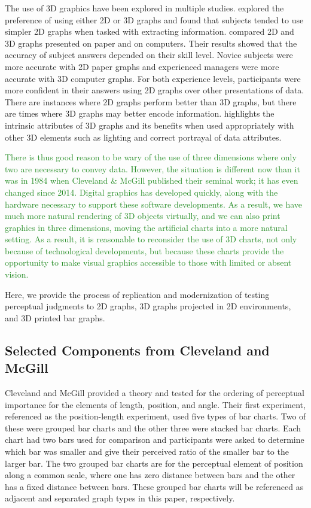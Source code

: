 \documentclass[letterpaper,inpress,dvipsnames]{jdsart}
\begin{document}
The use of 3D graphics have been explored in multiple studies.
\citet{fisher_data_1997} explored the preference of using either 2D or 3D graphs and found that subjects tended to use simpler 2D graphs when tasked with extracting information. \citet{barfield_effects_1989} compared 2D and 3D graphs presented on paper and on computers.
Their results showed that the accuracy of subject answers depended on their skill level.
Novice subjects were more accurate with 2D paper graphs and experienced managers were more accurate with 3D computer graphs.
For both experience levels, participants were more confident in their answers using 2D graphs over other presentations of data.
There are instances where 2D graphs perform better than 3D graphs, but there are times where 3D graphs may better encode information.
\citet{brath_3d_2014} highlights the intrinsic attributes of 3D graphs and its benefits when used appropriately with other 3D elements such as lighting and correct portrayal of data attributes.

{\textcolor{ForestGreen}{There is thus good reason to be wary of the use of three dimensions where only two are necessary to convey data. 
However, the situation is different now than it was in 1984 when Cleveland \& McGill published their seminal work; it has even changed since 2014. 
Digital graphics has developed quickly, along with the hardware necessary to support these software developments. 
As a result, we have much more natural rendering of 3D objects virtually, and we can also print graphics in three dimensions, moving the artificial charts into a more natural setting.
As a result, it is reasonable to reconsider the use of 3D charts, not only because of technological developments, but because these charts provide the opportunity to make visual graphics accessible to those with limited or absent vision.}}

Here, we provide the process of replication and modernization of testing perceptual judgments to 2D graphs, 3D graphs projected in 2D environments, and 3D printed bar graphs.

\hypertarget{selected-components-from-cleveland-and-mcgill}{%
\subsection{Selected Components from Cleveland and McGill}\label{selected-components-from-cleveland-and-mcgill}}

Cleveland and McGill provided a theory and tested for the ordering of perceptual importance for the elements of length, position, and angle.
Their first experiment, referenced as the position-length experiment, used five types of bar charts.
Two of these were grouped bar charts and the other three were stacked bar charts.
Each chart had two bars used for comparison and participants were asked to determine which bar was smaller and give their perceived ratio of the smaller bar to the larger bar.
The two grouped bar charts are for the perceptual element of position along a common scale, where one has zero distance between bars and the other has a fixed distance between bars.
These grouped bar charts will be referenced as adjacent and separated graph types in this paper, respectively.
\end{document}
